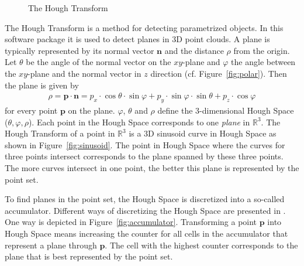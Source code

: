 \documentclass{InsightArticle}
\newcommand{\V}[1]{\mathbf{#1}}
\begin{document}
\begin{figure}
\centering
{}
\caption{The Hough Transform}
\end{figure}

The Hough Transform \cite{Hough:1962, Duda:1971} is a method for detecting parametrized
objects. In this software package it is used to detect planes in 3D point
clouds. A plane is typically represented by its normal vector $\V{n}$ and the
distance $\rho$
from the origin. Let $\theta$ be the angle of the normal vector on the
$xy$-plane and $\varphi$ the angle between the $xy$-plane and the normal vector
in $z$ direction (cf. Figure~\ref{fig:polar}). Then the plane is given by 
\begin{align*}
\rho = \V{p} \cdot \V{n} = 
{p}_x \cdot \cos{\theta} \cdot \sin{\varphi} + {p}_y \cdot \sin{\varphi} \cdot
\sin{\theta} + {p}_z \cdot \cos{\varphi}
\end{align*}
for every point $\V{p}$ on the plane.
$\varphi$, $\theta$ and $\rho$ define the 3-dimensional Hough Space
($\theta,\varphi,\rho$). Each point in the Hough Space corresponds to one
\emph{plane} in $\mathbb{R}^3$. 
The Hough Transform of a point in $\mathbb{R}^3$
is a 3D sinusoid curve in Hough Space as shown in Figure~\ref{fig:sinusoid}. The point in Hough Space where the
curves for three points intersect corresponds to the plane spanned by these three
points. The more curves intersect in one point, the better this plane is
represented by the point set. 

To find planes in the point set, the Hough
Space is discretized into a so-called accumulator. Different ways of discretizing the Hough Space are
presented in \cite{Borrmann:2011}. One way is depicted in
Figure~\ref{fig:accumulator}.
Transforming a point $\V{p}$ into Hough Space means increasing the counter for all cells in the accumulator
that represent a plane through $\V{p}$. The cell with the highest
counter corresponds to the plane that is best represented by the point set.
\end{document}
